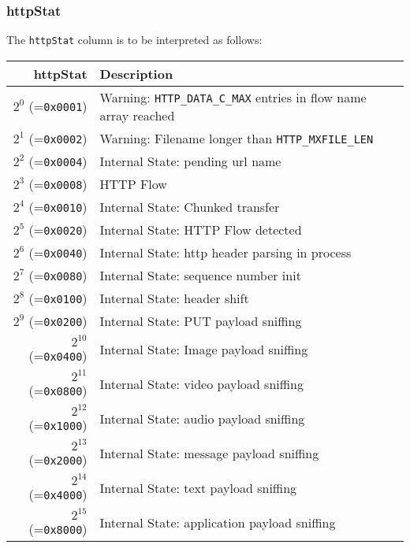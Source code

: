 \documentclass[documentation]{subfiles}
\begin{document}
\subsubsection{httpStat}\label{httpStat}
The {\tt httpStat} column is to be interpreted as follows:
\begin{longtable}{rl}
    \toprule
    {\bf httpStat} & {\bf Description}\\
    \midrule\endhead%
    $2^{0}$  (={\tt 0x0001}) & Warning: {\tt HTTP\_DATA\_C\_MAX} entries in flow name array reached\\
    $2^{1}$  (={\tt 0x0002}) & Warning: Filename longer than {\tt HTTP\_MXFILE\_LEN} \\
    $2^{2}$  (={\tt 0x0004}) & Internal State: pending url name\\
    $2^{3}$  (={\tt 0x0008}) & HTTP Flow\\
    $2^{4}$  (={\tt 0x0010}) & Internal State: Chunked transfer \\
    $2^{5}$  (={\tt 0x0020}) & Internal State: HTTP Flow detected \\
    $2^{6}$  (={\tt 0x0040}) & Internal State: http header parsing in process \\
    $2^{7}$  (={\tt 0x0080}) & Internal State: sequence number init \\
    $2^{8}$  (={\tt 0x0100}) & Internal State: header shift \\
    $2^{9}$  (={\tt 0x0200}) & Internal State: PUT payload sniffing \\
    $2^{10}$ (={\tt 0x0400}) & Internal State: Image payload sniffing \\
    $2^{11}$ (={\tt 0x0800}) & Internal State: video payload sniffing \\
    $2^{12}$ (={\tt 0x1000}) & Internal State: audio payload sniffing \\
    $2^{13}$ (={\tt 0x2000}) & Internal State: message payload sniffing \\
    $2^{14}$ (={\tt 0x4000}) & Internal State: text payload sniffing \\
    $2^{15}$ (={\tt 0x8000}) & Internal State: application payload sniffing \\
    \bottomrule
\end{longtable}
\end{document}

